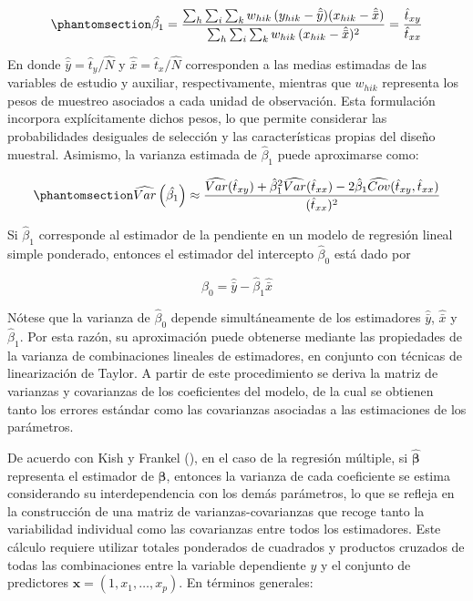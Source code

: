 \documentclass[
  spanish,
  11pt,
  letterpaper,
  oneside,
  open=any]{scrbook}
\begin{document}
\begin{equation}\protect\phantomsection\label{eq-pendiente-ponderada}{
\hat{\beta_{1}}  =
\frac{\sum_{h} \sum_{i} \sum_{k} w_{hik}\,(y_{hik}-\hat{\bar{y}})(x_{hik}-\hat{\bar{x}})}
{\sum_{h} \sum_{i} \sum_{k} w_{hik}\,(x_{hik}-\hat{\bar{x}})^{2}}
=
\frac{\hat{t}_{xy}}{\hat{t}_{xx}}
}\end{equation}

En donde \(\hat{\bar{y}}=\hat{t}_y/\hat{N}\) y
\(\hat{\bar{x}}=\hat{t}_x/\hat{N}\) corresponden a las medias estimadas
de las variables de estudio y auxiliar, respectivamente, mientras que
\(w_{hik}\) representa los pesos de muestreo asociados a cada unidad de
observación. Esta formulación incorpora explícitamente dichos pesos, lo
que permite considerar las probabilidades desiguales de selección y las
características propias del diseño muestral. Asimismo, la varianza
estimada de \(\hat{\beta}_1\) puede aproximarse como:

\begin{equation}\protect\phantomsection\label{eq-varianza-pendiente}{
\widehat{Var}\left(\hat{\beta_{1}}\right)
\approx  \frac{\widehat{Var}(\hat{t}_{xy})+\hat{\beta}_{1}^{2}\widehat{Var}(\hat{t}_{xx})-2\hat{\beta}_{1}\widehat{Cov}(\hat{t}_{xy},\hat{t}_{xx})}{(\hat{t}_{xx})^{2}}
}\end{equation}

Si \(\hat{\beta}_{1}\) corresponde al estimador de la pendiente en un
modelo de regresión lineal simple ponderado, entonces el estimador del
intercepto \(\hat{\beta}_{0}\) está dado por

\[
\hat{\beta}_{0} = \hat{\bar{y}} - \hat{\beta}_{1}\hat{\bar{x}}
\]

Nótese que la varianza de \(\hat{\beta}_{0}\) depende simultáneamente de
los estimadores \(\hat{\bar{y}}\), \(\hat{\bar{x}}\) y
\(\hat{\beta}_{1}\). Por esta razón, su aproximación puede obtenerse
mediante las propiedades de la varianza de combinaciones lineales de
estimadores, en conjunto con técnicas de linearización de Taylor. A
partir de este procedimiento se deriva la matriz de varianzas y
covarianzas de los coeficientes del modelo, de la cual se obtienen tanto
los errores estándar como las covarianzas asociadas a las estimaciones
de los parámetros.

De acuerdo con Kish y Frankel (),
en el caso de la regresión múltiple, si \(\hat{\boldsymbol{\beta}}\)
representa el estimador de \(\boldsymbol{\beta}\), entonces la varianza
de cada coeficiente se estima considerando su interdependencia con los
demás parámetros, lo que se refleja en la construcción de una matriz de
varianzas-covarianzas que recoge tanto la variabilidad individual como
las covarianzas entre todos los estimadores. Este cálculo requiere
utilizar totales ponderados de cuadrados y productos cruzados de todas
las combinaciones entre la variable dependiente \(y\) y el conjunto de
predictores \(\mathbf{x} = (1, x_1, \ldots, x_p)\). En términos
generales:
\end{document}
